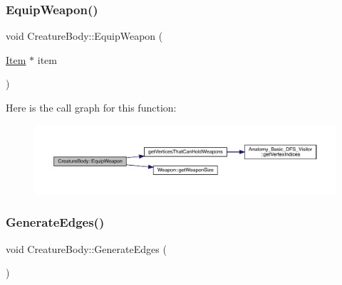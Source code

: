 \subsubsection{\texorpdfstring{Equip\+Weapon()}{EquipWeapon()}}
{\footnotesize\ttfamily void Creature\+Body\+::\+Equip\+Weapon (\begin{DoxyParamCaption}\item[{\mbox{\hyperlink{class_item}{Item}} $\ast$}]{item }\end{DoxyParamCaption})}

Here is the call graph for this function\+:
\nopagebreak
\begin{figure}[H]
\begin{center}
\leavevmode
\includegraphics[width=350pt]{da/d7d/class_creature_body_af329b825db569100370683f7a9b0263c_cgraph}
\end{center}
\end{figure}
\mbox{\label{class_creature_body_a8feda2cfc35e1b76730a31eb368ffed6}} 
\subsubsection{\texorpdfstring{Generate\+Edges()}{GenerateEdges()}}
{\footnotesize\ttfamily void Creature\+Body\+::\+Generate\+Edges (\begin{DoxyParamCaption}{ }\end{DoxyParamCaption})}

